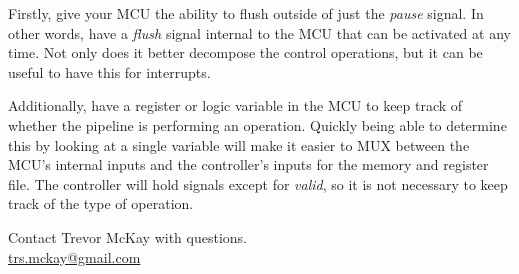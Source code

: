 \documentclass[10pt,a4paper]{article}
\begin{document}
Firstly, give your MCU the ability to flush outside of just the \emph{pause} signal.
In other words, have a \emph{flush} signal internal to the MCU that can be activated at any time.
Not only does it better decompose the control operations, but it can be useful to have this
for interrupts.

Additionally, have a register or logic variable in the MCU to keep track of whether the pipeline
is performing an operation. Quickly being able to determine this by looking at a single variable 
will make it easier to MUX between the MCU's internal inputs and the controller's inputs for
the memory and register file. The controller will hold signals except for \emph{valid}, so it is not
necessary to keep track of the type of operation.

\vspace*{\fill}
\begin{center}
    \noindent Contact Trevor McKay with questions.\\
    \href{mailto:trs.mckay@gmail.com}{trs.mckay@gmail.com}
\end{center}
\end{document}
